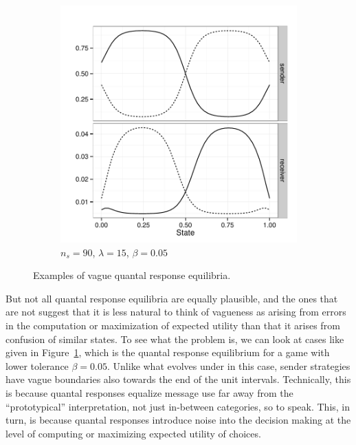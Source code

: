\documentclass[fleqn,reqno,10pt]{article}
\newcommand{\rdd}{\acro{rdd}} %
\newcommand{\toler}{\ensuremath{\beta}} %
\newcommand{\ns}{\ensuremath{n_s}} %
\begin{document}
\begin{figure}
\begin{subfigure}[]{0.45\textwidth}
    \includegraphics[width=\textwidth]{plots/exampleStratQRE_tolerance005.pdf}
    \caption{$\ns = 90$, $\lambda = 15$, $\toler = 0.05$}
    \label{fig:exampleQRE_stratsB}
  \end{subfigure}

  \caption{Examples of vague quantal response equilibria.}
  \label{fig:exampleQREs}
\end{figure}


But not all quantal response equilibria are equally plausible, and the
ones that are not suggest that it is less natural to think of
vagueness as arising from errors in the computation or maximization of
expected utility than that it arises from confusion of similar
states. To see what the problem is, we can look at cases like given in
Figure~\ref{fig:exampleQRE_stratsB}, which is the quantal response
equilibrium for a game with lower tolerance $\toler = 0.05$. Unlike
what evolves under \rdd in this case, sender strategies have vague
boundaries also towards the end of the unit intervals. Technically,
this is because quantal responses equalize message use far away from
the ``prototypical'' interpretation, not just in-between categories,
so to speak. This, in turn, is because quantal responses introduce
noise into the decision making at the level of computing or maximizing
expected utility of choices.
\end{document}
